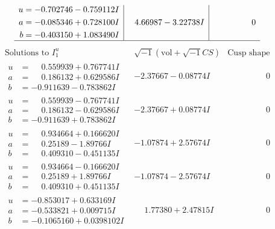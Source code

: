 \documentclass[1p]{elsarticle_modified}
\theoremstyle{definition}
\newcommand{\I}{\sqrt{-1}}
\begin{document}
$$\begin{array}{c|c|c}
\begin{aligned}
u &= -0.702746 - 0.759112 I \\
a &= -0.085346 + 0.728100 I \\
b &= -0.403150 + 1.083490 I\end{aligned}
 & \phantom{-}4.66987 - 3.22738 I & \phantom{-0.000000 } 0\\
 \hline 
 \end{array}$$\newpage$$\begin{array}{c|c|c}  
\text{Solutions to }I^u_{1}& \I (\text{vol} + \sqrt{-1}CS) & \text{Cusp shape}\\
 \hline 
\begin{aligned}
u &= \phantom{-}0.559939 + 0.767741 I \\
a &= \phantom{-}0.186132 + 0.629586 I \\
b &= -0.911639 - 0.783862 I\end{aligned}
 & -2.37667 - 0.08774 I & \phantom{-0.000000 } 0 \\ \hline\begin{aligned}
u &= \phantom{-}0.559939 - 0.767741 I \\
a &= \phantom{-}0.186132 - 0.629586 I \\
b &= -0.911639 + 0.783862 I\end{aligned}
 & -2.37667 + 0.08774 I & \phantom{-0.000000 } 0 \\ \hline\begin{aligned}
u &= \phantom{-}0.934664 + 0.166620 I \\
a &= \phantom{-}0.25189 - 1.89766 I \\
b &= \phantom{-}0.409310 - 0.451135 I\end{aligned}
 & -1.07874 + 2.57674 I & \phantom{-0.000000 } 0 \\ \hline\begin{aligned}
u &= \phantom{-}0.934664 - 0.166620 I \\
a &= \phantom{-}0.25189 + 1.89766 I \\
b &= \phantom{-}0.409310 + 0.451135 I\end{aligned}
 & -1.07874 - 2.57674 I & \phantom{-0.000000 } 0 \\ \hline\begin{aligned}
u &= -0.853017 + 0.633169 I \\
a &= -0.533821 + 0.009715 I \\
b &= -0.1065160 + 0.0398102 I\end{aligned}
 & \phantom{-}1.77380 + 2.47815 I & \phantom{-0.000000 } 0 \\ \hline\begin{aligned}

\end{aligned}
\end{array}$$
\end{document}
